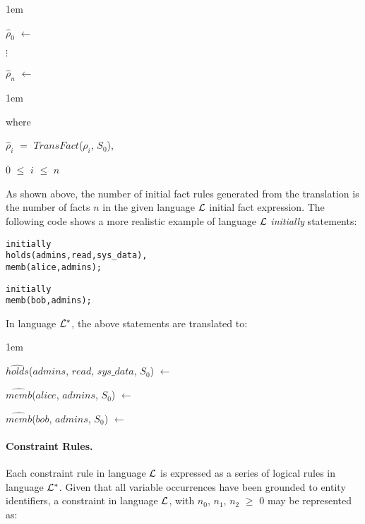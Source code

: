 \documentclass[11pt]{report}
\newenvironment{vverbatim}
{
  \begin{alltt}
}
{
    \vspace{-\baselineskip}
  \end{alltt}
}
\newenvironment{vquote}
{
  \begin{list}{}{\leftmargin 1em}\item[]
}
{
  \end{list}
}
\begin{document}
            \begin{vquote}
              $\hat{\rho}_{0}$ $\leftarrow$

              $\vdots$

              $\hat{\rho}_{n}$ $\leftarrow$
            \end{vquote}

            \begin{vquote}
              where

              \hspace{1em}
              $\hat{\rho}_{i}$ $=$ $TransFact$($\rho_{i}$, $S_{0}$),

              \hspace{1em}
              $0$ $\leq$ $i$ $\leq$ $n$
            \end{vquote}

            As shown above, the number of initial fact rules generated from the
            translation is the number of facts $n$ in the given language
            ${\cal L}$ initial fact expression. The following code shows a
            more realistic example of language ${\cal L}$ {\em initially}
            statements:

            \begin{vverbatim}
  initially
    holds(admins, read, sys\_data),
    memb(alice, admins);

  initially
    memb(bob, admins);
            \end{vverbatim}

            \noindent
            In language ${\cal L}^{*}$, the above statements are translated to:

            \begin{vquote}
              $\hat{holds}$($admins$, $read$, $sys\_data$, $S_{0}$)
                $\leftarrow$

              $\hat{memb}$($alice$, $admins$, $S_{0}$) $\leftarrow$

              $\hat{memb}$($bob$, $admins$, $S_{0}$) $\leftarrow$
            \end{vquote}

          \paragraph{Constraint Rules.}

            Each constraint rule in language ${\cal L}$ is expressed as a
            series of logical rules in language ${\cal L}^{*}$. Given that all
            variable occurrences have been grounded to entity identifiers, a
            constraint in language ${\cal L}$, with $n_0$, $n_1$, $n_2$ $\geq$
            $0$ may be represented as:
\end{document}
